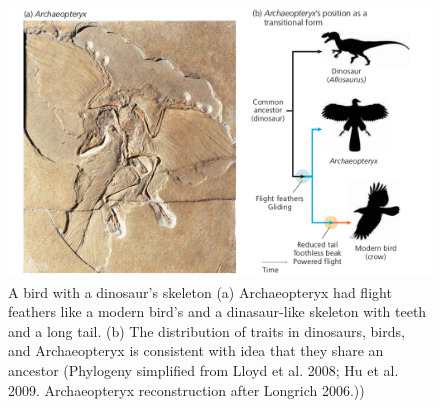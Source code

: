 \documentclass[11pt,dvipsnames,ignorenonframetext,aspectratio=169]{beamer}
\begin{document}
\begin{frame}{}
\protect\hypertarget{section}{}
\begin{figure}
\includegraphics[width=0.6\linewidth]{./../images/modern_ancient_birds} \caption{A bird with a dinosaur's skeleton (a) Archaeopteryx had flight feathers like a modern bird's and a dinasaur-like skeleton with teeth and a long tail. (b) The distribution of traits in dinosaurs, birds, and Archaeopteryx is consistent with idea that they share an ancestor (Phylogeny simplified from Lloyd et al. 2008; Hu et al. 2009. Archaeopteryx reconstruction after Longrich 2006.))}\label{fig:tree-of-life}
\end{figure}
\end{frame}
\end{document}
